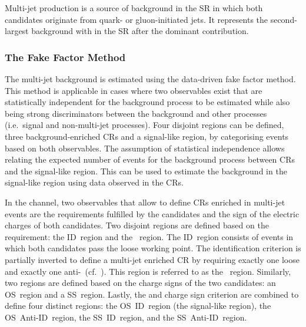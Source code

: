 Multi-jet production is a source of background in the \hadhad SR in which both
\tauhadvis candidates originate from quark- or gluon-initiated jets. It
represents the second-largest background with \faketauhadvis in the \hadhad SR
after the dominant \ttbarFakes contribution.

\subsubsection{The Fake Factor Method}

The multi-jet background is estimated using the data-driven fake factor
method. This method is applicable in cases where two observables exist that are
statistically independent for the background process to be estimated while also
being strong discriminators between the background and other processes (i.e.\
signal and non-multi-jet processes). Four disjoint regions can be defined, three
background-enriched CRs and a signal-like region, by categorising events based
on both observables. The assumption of statistical independence allows relating
the expected number of events for the background process between CRs and the
signal-like region. This can be used to estimate the background in the
signal-like region using data observed in the CRs.

In the \hadhad channel, two observables that allow to define CRs enriched in
multi-jet events are the \tauid requirements fulfilled by the \tauhadvis
candidates and the sign of the electric charges of both candidates. Two disjoint
regions are defined based on the \tauid requirement: the ID~region and the
\antiid~region. The ID~region consists of events in which both \tauhadvis
candidates pass the loose \tauid working point. The identification criterion is
partially inverted to define a multi-jet enriched CR by requiring exactly one
loose \tauhadvis and exactly one
anti-\tauhadvis~(cf.~). This region is referred
to as the \antiid~region. Similarly, two regions are defined based on the charge
signs of the two \tauhadvis candidates: an OS~region and a SS~region. Lastly,
the \tauid and charge sign criterion are combined to define four distinct
regions: the OS~ID~region (the signal-like region), the OS~Anti-ID~region, the
SS~ID~region, and the SS~Anti-ID~region.

